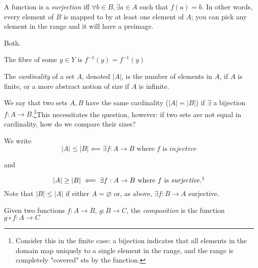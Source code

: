 \documentclass[12pt,oneside]{article}
\begin{document}
\begin{definition}[Surjective]
  A function is a \emph{surjection} iff $\forall b \in B, \exists a \in A$ such that $f(a) = b$. In other words, every element of $B$ is mapped to by at least one element of $A$; you can pick any element in the range and it will have a preimage.
\end{definition}

\begin{definition}[Bijective]
  Both.
\end{definition}

\begin{definition}[Fibre]
The fibre of some $y \in Y$ is $f^{-1}({y}) = f^{-1}(y)$
\end{definition}

\begin{definition}[Cardinality]
  The \emph{cardinality} of a set $A$, denoted $|A|$, is the number of elements in $A$, if $A$ is finite, or a more abstract notion of size if $A$ is infinite.
\end{definition}

We say that two sets $A, B$ have the same cardinality ($|A|=|B|$) if $\exists$ a bijection $f: A \to B$.\footnote{Consider this in the finite case: a bijection indicates that all elements in the domain map uniquely to a single element in the range, and the range is completely "covered" sts by the function.}This necessitates the question, however: if two sets are not equal in cardinality, how do we compare their sizes?

We write 
\[|A| \leq |B| \impliedby \exists f : A \to B \text{ where } f \text{ is } \textit{injective}\]

and 

\[|A| \geq |B| \impliedby \exists f: A \to B \text{ where } f \text{ is } \textit{surjective.}\footnotemark\] Note that $|B| \leq |A|$ if either $A = \varnothing$ or, as above, $\exists f: B \to A$ surjective.

\begin{definition}[Composition]
  Given two functions $f: A \to B$, $g: B \to C$, the \emph{composition} is the function $g \circ f : A \to C$
\end{definition}
  
\end{document}
